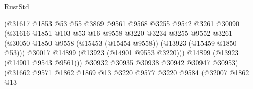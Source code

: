 \begin{lexlean}{RustStd}
\begin{coremodule}
                                          (@31617
                                            @1853
                                            @53
                                            @55
                                            @3869
                                            @9561
                                            @9568
                                            @3255
                                            @9542
                                            @3261
                                            @30090
                                            (@31616
                                              @1851
                                              @103
                                              @53
                                              @16
                                              @9558
                                              @3220
                                              @3234
                                              @3255
                                              @9552
                                              @3261
                                              (@30050
                                                @1850
                                                @9558
                                                (@15453 (@15454 @9558))
                                                (@13923 (@15459 @1850 @53)))
                                              @30017
                                              @14899
                                              (@13923 (@14901 @9553 @3220)))
                                            @14899
                                            (@13923 (@14901 @9543 @9561)))
                                          @30932
                                          @30935
                                          @30938
                                          @30942
                                          @30947
                                          @30953)
                                        (@31662
                                          @9571
                                          @1862
                                          @1869
                                          @13
                                          @3220
                                          @9577
                                          @3220
                                          @9584
                                          (@32007
                                            @1862
                                            @13

\end{coremodule}
\end{lexlean}
